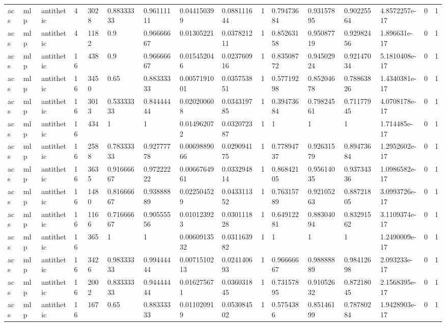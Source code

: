 \begin{tabular}{llllllllllllllll}
acs & mlp & antithetic & 4 & 3028 & 0.88333333 & 0.96111111 & 0.044150399 & 0.088111644 & 1 & 0.79473684 & 0.93157895 & 0.90225564 & 4.8572257e-17 & 0 & 1 \\
acs & mlp & antithetic & 4 & 1182 & 0.9 & 0.96666667 & 0.01305221 & 0.037821211 & 1 & 0.85263158 & 0.95087719 & 0.92982456 & 1.896631e-17 & 0 & 1 \\
acs & mlp & antithetic & 16 & 438 & 0.9 & 0.96666667 & 0.015452046 & 0.023760916 & 1 & 0.83508772 & 0.94502924 & 0.92147034 & 5.1810408e-17 & 0 & 1 \\
acs & mlp & antithetic & 16 & 3450 & 0.65 & 0.88333333 & 0.0057191001 & 0.035753851 & 1 & 0.57719298 & 0.85204678 & 0.78863826 & 1.4340381e-17 & 0 & 1 \\
acs & mlp & antithetic & 16 & 3013 & 0.53333333 & 0.84444444 & 0.020200608 & 0.034319785 & 1 & 0.39473684 & 0.79824561 & 0.71177945 & 4.0708178e-17 & 0 & 1 \\
acs & mlp & antithetic & 16 & 434 & 1 & 1 & 0.014962072 & 0.032072387 & 1 & 1 & 1 & 1 & 1.714485e-17 & 0 & 1 \\
acs & mlp & antithetic & 16 & 2588 & 0.78333333 & 0.92777778 & 0.0069889066 & 0.029094175 & 1 & 0.77894737 & 0.92631579 & 0.89473684 & 1.2952602e-17 & 0 & 1 \\
acs & mlp & antithetic & 16 & 3635 & 0.91666667 & 0.97222222 & 0.0066764961 & 0.033294814 & 1 & 0.86842105 & 0.95614035 & 0.93734336 & 1.0986582e-17 & 0 & 1 \\
acs & mlp & antithetic & 16 & 1480 & 0.81666667 & 0.93888889 & 0.022504529 & 0.043311352 & 1 & 0.76315789 & 0.92105263 & 0.88721805 & 3.0993726e-17 & 0 & 1 \\
acs & mlp & antithetic & 16 & 1166 & 0.71666667 & 0.90555556 & 0.010123923 & 0.030111828 & 1 & 0.64912281 & 0.88304094 & 0.83291562 & 3.1109374e-17 & 0 & 1 \\
acs & mlp & antithetic & 16 & 365 & 1 & 1 & 0.0060913532 & 0.031163982 & 1 & 1 & 1 & 1 & 1.2490009e-17 & 0 & 1 \\
acs & mlp & antithetic & 16 & 3426 & 0.98333333 & 0.99444444 & 0.0071510213 & 0.024140693 & 1 & 0.96666667 & 0.98888889 & 0.98412698 & 2.093233e-17 & 0 & 1 \\
acs & mlp & antithetic & 16 & 2002 & 0.83333333 & 0.94444444 & 0.016275671 & 0.036031845 & 1 & 0.73157895 & 0.91052632 & 0.87218045 & 2.1568395e-17 & 0 & 1 \\
acs & mlp & antithetic & 16 & 167 & 0.65 & 0.88333333 & 0.011020919 & 0.053084502 & 1 & 0.5754386 & 0.85146199 & 0.78780284 & 1.9428903e-17 & 0 & 1 \\

\end{tabular}
